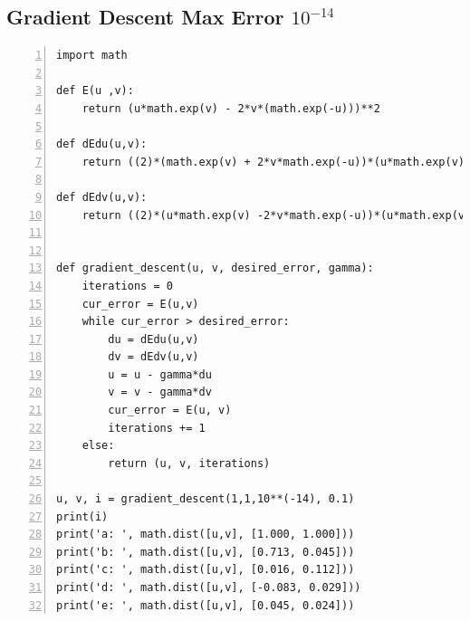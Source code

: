 \documentclass{article}
\begin{document}
\subsection{\label{prob5}Gradient Descent Max Error $10^{-14}$}
\begin{lstlisting}[frame=single,
numbers=left,
style=Matlab-Pyglike]
import math

def E(u ,v):
    return (u*math.exp(v) - 2*v*(math.exp(-u)))**2

def dEdu(u,v):
    return ((2)*(math.exp(v) + 2*v*math.exp(-u))*(u*math.exp(v) -2*v*math.exp(-u)))

def dEdv(u,v):
    return ((2)*(u*math.exp(v) -2*v*math.exp(-u))*(u*math.exp(v) - 2*math.exp(-u)))


def gradient_descent(u, v, desired_error, gamma):
    iterations = 0
    cur_error = E(u,v)
    while cur_error > desired_error:
        du = dEdu(u,v)
        dv = dEdv(u,v)
        u = u - gamma*du
        v = v - gamma*dv
        cur_error = E(u, v)
        iterations += 1
    else:
        return (u, v, iterations)

u, v, i = gradient_descent(1,1,10**(-14), 0.1)
print(i)
print('a: ', math.dist([u,v], [1.000, 1.000]))
print('b: ', math.dist([u,v], [0.713, 0.045]))
print('c: ', math.dist([u,v], [0.016, 0.112]))
print('d: ', math.dist([u,v], [-0.083, 0.029]))
print('e: ', math.dist([u,v], [0.045, 0.024]))
\end{lstlisting}
\newpage
\end{document}

